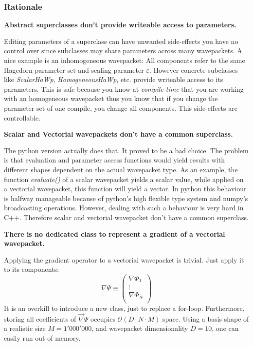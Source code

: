 \documentclass{article}
\begin{document}
\subsubsection{Rationale}

\textbf{Abstract superclasses don't provide writeable access to parameters.} \par
Editing parameters of a superclass can have unwanted side-effects
you have no control over since subclasses may share parameters across many wavepackets.
A nice example is an inhomogeneous wavepacket: All components refer to the same Hagedorn parameter set
and scaling parameter \(\varepsilon\).
However concrete subclasses like \emph{ScalarHaWp}, \emph{HomogeneousHaWp}, etc. provide writeable
access to its parameters. This is safe because you know at \emph{compile-time} that you are working with
an homogeneous wavepacket thus you know that if you change the parameter set of one compile, you change
all components. This side-effects are controllable.

\bigskip

\textbf{Scalar and Vectorial wavepackets don't have a common superclass.} \par
The python version actually does that. It proved to be a bad choice.
The problem is that evaluation and parameter access functions would yield
results with different shapes dependent on the actual wavepacket type.
As an example, the function \emph{evaluate()} of a scalar wavepacket yields a scalar value, while
applied on a vectorial wavepacket, this function will yield a vector.
In python this behaviour is halfway manageable because of python's high flexible type system
and numpy's broadcasting operations.
However, dealing with such a behaviour is very hard in C++.
Therefore scalar and vectorial wavepacket don't have a common superclass.

\bigskip

\textbf{There is no dedicated class to represent a gradient of a vectorial wavepacket.} \par
Applying the gradient operator to a vectorial wavepacket is trivial. Just apply it
to its components:
\[\nabla \Psi \equiv
\begin{pmatrix}
  \nabla \Phi_1 \\
  \vdots \\
  \nabla \Phi_N \\
\end{pmatrix}
\]
It is an overkill to introduce a new class, just to replace a for-loop.
Furthermore, storing all coefficients of \(\vec{\nabla}\Psi\) occupies \(\mathcal{O}(D \cdot N \cdot M)\) space.
Using a basis shape of a realistic size \(M=1'000'000\), and wavepacket
dimensionality \(D=10\), one can easily run out of memory.
\end{document}
